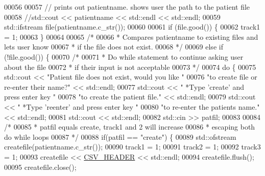 \begin{DoxyCode}
00056 
00057             \textcolor{comment}{// prints out patientname. shows user the path to the patient file}
00058             \textcolor{comment}{//std::cout << patientname << std::endl << std::endl;}
00059             std::ifstream file(patientname.c\_str());
00060 
00061             \textcolor{keywordflow}{if} (file.good()) \{
00062                 track1 = 1;
00063             \}
00064 
00065             \textcolor{comment}{/*}
00066 \textcolor{comment}{             * Compares patientname to existing files and lets user know}
00067 \textcolor{comment}{             * if the file does not exist.}
00068 \textcolor{comment}{             */}
00069             \textcolor{keywordflow}{else} \textcolor{keywordflow}{if} (!file.good()) \{
00070                 \textcolor{comment}{/* }
00071 \textcolor{comment}{                 * Do while statement to continue asking user about the file}
00072 \textcolor{comment}{                 * if their input is not acceptable}
00073 \textcolor{comment}{                 */} 
00074                 \textcolor{keywordflow}{do} \{
00075                     std::cout << \textcolor{stringliteral}{"Patient file does not exist, would you like "}
00076                         \textcolor{stringliteral}{"to create file or re-enter their name?"} << std::endl;
00077                     std::cout << \textcolor{stringliteral}{"  *Type 'create' and press enter key "}
00078                         \textcolor{stringliteral}{"to create the patient file."} << std::endl;
00079                     std::cout << \textcolor{stringliteral}{"  *Type 'reenter' and press enter key "}
00080                         \textcolor{stringliteral}{"to re-enter the patients name."} << std::endl;
00081                     std::cout << std::endl;
00082                     std::cin >> patfil;
00083 
00084                     \textcolor{comment}{/* }
00085 \textcolor{comment}{                     * patfil equals create, track1 and 2 will increase}
00086 \textcolor{comment}{                     * escaping both do while loops}
00087 \textcolor{comment}{                     */}
00088                     \textcolor{keywordflow}{if}(patfil == \textcolor{stringliteral}{"create"}) \{
00089                         std::ofstream createfile(patientname.c\_str());
00090                         track1 = 1;
00091                         track2 = 1;
00092                         track3 = 1;
00093                         createfile << \hyperlink{definitions_8hpp_ac686b5c4edb9968dade15aad6e58bdca}{CSV\_HEADER} << std::endl;
00094                         createfile.flush();
00095                         createfile.close();

\end{DoxyCode}
